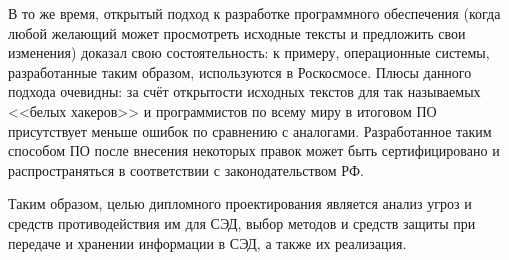 \vspace{\baselineskip}
В то же время, открытый подход к разработке программного обеспечения (когда любой желающий может просмотреть исходные тексты и предложить свои изменения) доказал свою состоятельность: к примеру, операционные системы, разработанные таким образом, используются в Роскосмосе. Плюсы данного подхода очевидны: за счёт открытости исходных текстов для так называемых <<белых хакеров>> и программистов по всему миру в итоговом ПО присутствует меньше ошибок по сравнению с аналогами. Разработанное таким способом ПО после внесения некоторых правок может быть сертифицировано и распространяться в соответствии с законодательством РФ.

\vspace{\baselineskip}
Таким образом, целью дипломного проектирования является анализ угроз и средств противодействия им для СЭД, выбор методов и средств защиты при передаче и хранении информации в СЭД, а также их реализация.
